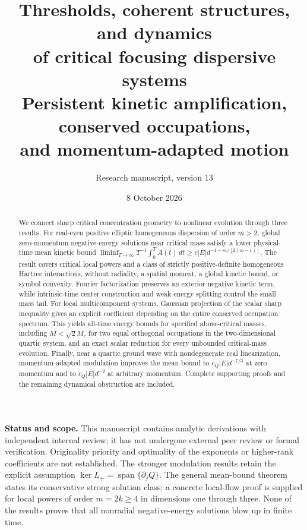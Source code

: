\documentclass[11pt,a4paper]{article}
\title{Thresholds, coherent structures, and dynamics\\of critical focusing dispersive systems\\[5pt]
\large Persistent kinetic amplification, conserved occupations,\\and momentum-adapted motion}
\author{Research manuscript, version 13}
\date{8 October 2026}
\theoremstyle{remark}\newtheorem{remark}[theorem]{Remark}
\begin{document}
\maketitle
\begin{abstract}
We connect sharp critical concentration geometry to nonlinear evolution
through three results. For real-even positive elliptic homogeneous
dispersion of order $m>2$, global zero-momentum negative-energy
solutions near critical mass satisfy a lower physical-time mean kinetic
bound $\liminf_{T\to\infty}T^{-1}\int_0^T A(t)\,dt
\ge c|E|d^{-1-m/[2(m-1)]}$. The result covers critical local powers
and a class of strictly positive-definite homogeneous Hartree
interactions, without radiality, a spatial moment, a global kinetic
bound, or symbol convexity. Fourier factorization preserves an exterior
negative kinetic term, while intrinsic-time center construction and
weak energy splitting control the small mass tail.
For local multicomponent systems, Gaussian projection of the scalar
sharp inequality gives an explicit coefficient depending on the entire
conserved occupation spectrum. This yields all-time energy bounds for
specified above-critical masses, including $M<\sqrt2M_c$ for two equal
orthogonal occupations in the two-dimensional quartic system, and an
exact scalar reduction for every unbounded critical-mass evolution.
Finally, near a quartic ground wave with nondegenerate real linearization,
momentum-adapted modulation improves the mean bound to
$c_Q|E|d^{-7/3}$ at zero momentum and to $c_Q|E|d^{-2}$ at arbitrary
momentum. Complete supporting proofs and the remaining dynamical
obstruction are included.
\end{abstract}

\noindent\textbf{Status and scope.}
This manuscript contains analytic derivations with independent internal
review; it has not undergone external peer review or formal verification.
Originality priority and optimality of the exponents or higher-rank
coefficients are not established. The stronger modulation results
retain the explicit assumption $\ker L_+=\operatorname{span}\{\partial_jQ\}$.
The general mean-bound theorem states its conservative strong solution
class; a concrete local-flow proof is supplied for local powers of
order $m=2k\ge4$ in dimensions one through three. None of the results
proves that all nonradial negative-energy solutions blow up in finite time.
\end{document}
